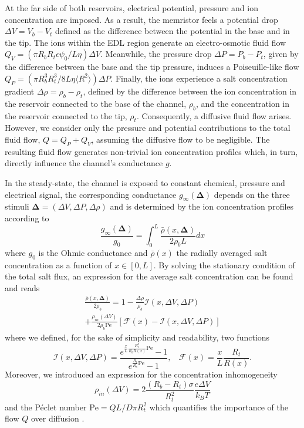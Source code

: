 \documentclass[reprint,superscriptaddress,prb,showkeys]{revtex4-2}
\newcommand{\brac}[1]{\left(#1 \right)} %
\begin{document}
At the far side of both reservoirs, electrical potential, pressure and ion concentration are imposed. As a result, the memristor feels a potential drop $\Delta V = V_b - V_t$ defined as the difference between the potential in the base and in the tip. The ions within the EDL region generate an electro-osmotic fluid flow $Q_V = (\pi R_b R_t\epsilon\psi_0/L\eta)\Delta V$. Meanwhile, the pressure drop $\Delta P = P_b - P_t$, given by the difference between the base and the tip pressure, induces a Poiseuille-like flow $Q_P = (\pi R_b^3 R_t^3/8L\eta\langle R^2\rangle)\Delta P$. Finally, the ions experience a salt concentration gradient $\Delta \rho = \rho_b - \rho_t$, defined by the difference between the ion concentration in the reservoir connected to the base of the channel, $\rho_b$, and the concentration in the reservoir connected to the tip, $\rho_t$. Consequently, a diffusive fluid flow arises. However, we consider only the pressure and potential contributions to the total fluid flow, $Q = Q_P + Q_V$, assuming the diffusive flow to be negligible.  The resulting fluid flow generates non-trivial ion concentration profiles which, in turn, directly influence the channel's conductance $g$. 

In the steady-state, the channel is exposed to constant chemical, pressure and electrical signal, the corresponding conductance $g_{\infty}\brac{\boldsymbol{\Delta}}$ depends on the three stimuli $\boldsymbol{\Delta}= (\Delta V, \Delta P, \Delta \rho)$ and is determined by the ion concentration profiles according to 
\[
\frac{g_{\infty}\brac{\boldsymbol{\Delta}}}{g_0} = \int_0^{L} \frac{\bar{\rho}\left(x, \boldsymbol{\Delta}\right)}{2\rho_b L} dx                                           
\]
where $g_0$ is the Ohmic conductance and $\bar{\rho}(x)$ the radially averaged salt concentration as a function of $x\in[0,L]$\cite{Rene_IonicNeuromorphic}. By solving the stationary condition of the total salt flux, an expression for the average salt concentration can be found and reads
\begin{multline}
\frac{\bar{\rho}\left(x, \boldsymbol{\Delta}\right)}{2\rho_b} = 1 - \frac{\Delta \rho}{\rho_b} \mathcal{I}\left(x, \Delta V, \Delta P\right) \\
 + \frac{ \rho_{in}\left( \Delta V \right) }{2\rho_b \text{Pe}} \left[ \mathcal{F}(x) - \mathcal{I}\left(x, \Delta V, \Delta P\right) \right]
\label{eq:rho_average}
\end{multline}
where we defined, for the sake of simplicity and readability, two functions
\[
\mathcal{I}\left(x, \Delta V, \Delta P\right) = \frac{e^{\frac{x}{L}\frac{R_t^2}{R_b R(x)} \text{Pe}}-1}{e^{\frac{R_t}{R_b} \text{Pe}}-1}, \ \ \ \ \mathcal{F}(x) = \frac{x}{L}\frac{R_t}{R(x)}.
\]
Moreover, we introduced an expression for the concentration inhomogeneity 
\[
\rho_{in}\brac{\Delta V} = 2\frac{(R_b-R_t)\sigma}{R_t^2}\frac{e\Delta V}{k_B T}
\]
and the Péclet number
$
\text{Pe} = QL/D\pi R_t^2
$
which quantifies the importance of the flow $Q$ over diffusion \cite{Rene_PressureSensitive}.
\end{document}

